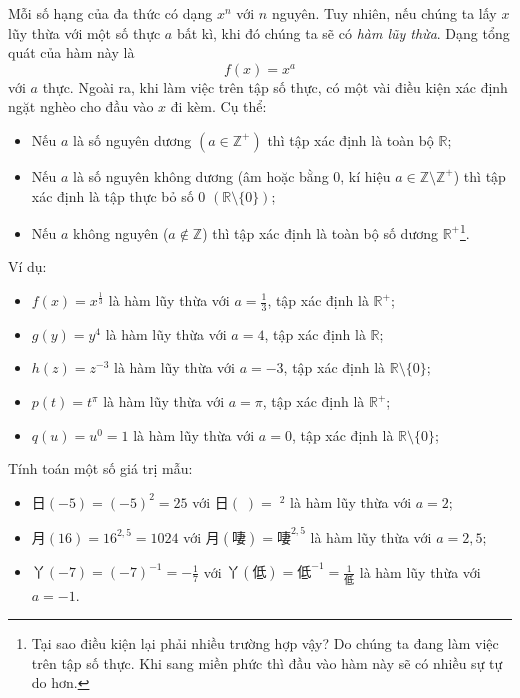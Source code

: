 \solution

Mỗi số hạng của đa thức có dạng $x^n$ với $n$ nguyên. Tuy nhiên, nếu chúng ta lấy $x$ lũy thừa với một số thực $a$ bất kì, khi đó chúng ta sẽ có \emph{hàm lũy thừa}. Dạng tổng quát của hàm này là $$f(x) = x^a$$ với $a$ thực. Ngoài ra, khi làm việc trên tập số thực, có một vài điều kiện xác định ngặt nghèo cho đầu vào $x$ đi kèm. Cụ thể:
\begin{itemize}
   \item Nếu $a$ là số nguyên dương $\left(a \in \mathbb{Z}^+\right)$ thì tập xác định là toàn bộ $\mathbb{R}$;
   \item Nếu $a$ là số nguyên không dương (âm hoặc bằng $0$, kí hiệu $a \in \mathbb{Z} \setminus\mathbb{Z}^+$) thì tập xác định là tập thực bỏ số $0$ $\left(\mathbb{R} \setminus \{0\}\right)$;
   \item Nếu $a$ không nguyên ($a \notin \mathbb{Z}$) thì tập xác định là toàn bộ số dương $\mathbb{R}^+$\footnote{Tại sao điều kiện lại phải nhiều trường hợp vậy? Do chúng ta đang làm việc trên tập số thực. Khi sang miền phức thì đầu vào hàm này sẽ có nhiều sự tự do hơn.}.
\end{itemize}
Ví dụ:
\begin{itemize}
   \item $f(x) = x^{\frac{1}{3}}$ là hàm lũy thừa với $a = \frac{1}{3}$, tập xác định là $\mathbb{R}^+$;
   \item $g(y) = y^{4}$ là hàm lũy thừa với $a = 4$, tập xác định là $\mathbb{R}$;
   \item $h(z) = z^{-3}$ là hàm lũy thừa với $a = -3$, tập xác định là $\mathbb{R} \setminus \{0\}$;
   \item $p(t) = t^{\pi}$ là hàm lũy thừa với $a = \pi$, tập xác định là $\mathbb{R}^+$;
   \item $q(u) = u^0 = 1$ là hàm lũy thừa với $a = 0$, tập xác định là $\mathbb{R} \setminus \{0\}$;
\end{itemize}
Tính toán một số giá trị mẫu:
\begin{itemize}
   \item $\textit{日}(-5) = (-5)^2 = 25$ với $\textit{日}\left(\textit{𠶎}\right) = \textit{𠶎}^2$ là hàm lũy thừa với $a = 2$;
   \item $\textit{月}(16) = 16^{2,5} = 1024$ với $\textit{月}\left(\textit{啛}\right) = \textit{啛}^{2,5}$ là hàm lũy thừa với $a = 2,5$;
   \item $\textit{丫}(-7) = (-7)^{-1} = -\frac{1}{7}$ với $\textit{丫}\left(\textit{低}\right) = \textit{低}^{-1} = \frac{1}{\textit{低}}$ là hàm lũy thừa với $a = -1$.
\end{itemize}

